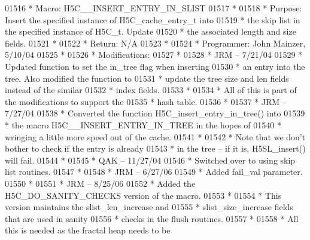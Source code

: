 \begin{DoxyCode}
01516 \textcolor{comment}{ * Macro:   H5C\_\_INSERT\_ENTRY\_IN\_SLIST}
01517 \textcolor{comment}{ *}
01518 \textcolor{comment}{ * Purpose:     Insert the specified instance of H5C\_cache\_entry\_t into}
01519 \textcolor{comment}{ *      the skip list in the specified instance of H5C\_t.  Update}
01520 \textcolor{comment}{ *      the associated length and size fields.}
01521 \textcolor{comment}{ *}
01522 \textcolor{comment}{ * Return:      N/A}
01523 \textcolor{comment}{ *}
01524 \textcolor{comment}{ * Programmer:  John Mainzer, 5/10/04}
01525 \textcolor{comment}{ *}
01526 \textcolor{comment}{ * Modifications:}
01527 \textcolor{comment}{ *}
01528 \textcolor{comment}{ *      JRM -- 7/21/04}
01529 \textcolor{comment}{ *      Updated function to set the in\_tree flag when inserting}
01530 \textcolor{comment}{ *      an entry into the tree.  Also modified the function to}
01531 \textcolor{comment}{ *      update the tree size and len fields instead of the similar}
01532 \textcolor{comment}{ *      index fields.}
01533 \textcolor{comment}{ *}
01534 \textcolor{comment}{ *      All of this is part of the modifications to support the}
01535 \textcolor{comment}{ *      hash table.}
01536 \textcolor{comment}{ *}
01537 \textcolor{comment}{ *      JRM -- 7/27/04}
01538 \textcolor{comment}{ *      Converted the function H5C\_insert\_entry\_in\_tree() into}
01539 \textcolor{comment}{ *      the macro H5C\_\_INSERT\_ENTRY\_IN\_TREE in the hopes of}
01540 \textcolor{comment}{ *      wringing a little more speed out of the cache.}
01541 \textcolor{comment}{ *}
01542 \textcolor{comment}{ *      Note that we don't bother to check if the entry is already}
01543 \textcolor{comment}{ *      in the tree -- if it is, H5SL\_insert() will fail.}
01544 \textcolor{comment}{ *}
01545 \textcolor{comment}{ *      QAK -- 11/27/04}
01546 \textcolor{comment}{ *      Switched over to using skip list routines.}
01547 \textcolor{comment}{ *}
01548 \textcolor{comment}{ *      JRM -- 6/27/06}
01549 \textcolor{comment}{ *      Added fail\_val parameter.}
01550 \textcolor{comment}{ *}
01551 \textcolor{comment}{ *      JRM -- 8/25/06}
01552 \textcolor{comment}{ *      Added the H5C\_DO\_SANITY\_CHECKS version of the macro.}
01553 \textcolor{comment}{ *}
01554 \textcolor{comment}{ *      This version maintains the slist\_len\_increase and}
01555 \textcolor{comment}{ *      slist\_size\_increase fields that are used in sanity}
01556 \textcolor{comment}{ *      checks in the flush routines.}
01557 \textcolor{comment}{ *}
01558 \textcolor{comment}{ *      All this is needed as the fractal heap needs to be}

\end{DoxyCode}
